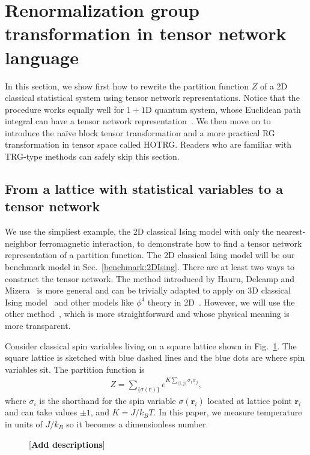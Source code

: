 \documentclass[aps,prb,reprint,superscriptaddress]{revtex4-2}
\begin{document}
\section{Renormalization group transformation in tensor network
language\label{introTRG}}
In this section, we show first how to rewrite the partition function $Z$ of
a 2D classical statistical system using tensor network representations.
Notice that the procedure works equally well for $1 + 1$D quantum
system, whose Euclidean path integral can have a tensor network
representation~\cite{GuWen2009}. We then move on to introduce the
na\"ive block tensor transformation and a more practical RG
transformation in tensor space called HOTRG. Readers who are familiar
with TRG-type methods can safely skip this section.
%

\subsection{From a lattice with statistical variables to a tensor
network\label{spin2tensor}}
We use the simpliest example, the 2D classical Ising model with only the
nearest-neighbor ferromagnetic interaction, to demonstrate how to find a
tensor network representation of a partition function. The 2D classical
Ising model will be our benchmark model in Sec.~\ref{benchmark:2DIsing}.
There are at least two ways to construct the tensor network. The method
introduced by Hauru, Delcamp and Mizera~\cite{gilts} is more general and
can be trivially adapted to apply on 3D classical Ising
model~\cite{hotrg} and other models like $\phi^4$ theory in
2D~\cite{Delcamp2020}. However, we will use the other method~\cite{trg,
tnr}, which is more straightforward and whose physical meaning is more
transparent.
%

Consider classical spin variables living on a sqaure lattice shown in
Fig.~\ref{fig:spin2tensor}. The square lattice is sketched with blue
dashed lines and the blue dots are where spin variables sit. The
partition function is
%
\begin{align}\label{eq:2DIsingZ}
    Z = \sum_{\{\sigma(\mathbf{r})\}}e^{K\sum_{\langle i,j
        \rangle}\sigma_i \sigma_j},
\end{align}
where $\sigma_i$ is the shorthand for the spin variable
$\sigma(\mathbf{r}_i)$ located at lattice point $\mathbf{r}_i$ and can
take values $\pm 1$, and $K = J / k_B T$. In this paper, we measure
temperature in units of $J / k_B $ so it becomes a dimensionless number.
\begin{figure}[htb]
    \caption{\label{fig:spin2tensor}[\textbf{Add descriptions}]}
\end{figure}
%
\end{document}
